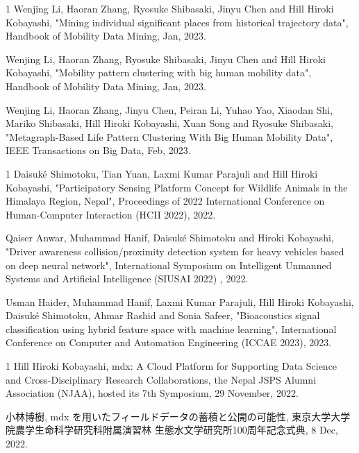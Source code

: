 \begin{雑誌論文}{1}
Wenjing Li, Haoran Zhang, Ryosuke Shibasaki,  Jinyu Chen and Hill Hiroki Kobayashi,  "Mining individual significant places from historical trajectory data", Handbook of Mobility Data Mining, Jan, 2023.

Wenjing Li, Haoran Zhang, Ryosuke Shibasaki,  Jinyu Chen and Hill Hiroki Kobayashi,  "Mobility pattern clustering with big human mobility data", Handbook of Mobility Data Mining, Jan, 2023.

Wenjing Li, Haoran Zhang, Jinyu Chen, Peiran Li, Yuhao Yao, Xiaodan Shi,  Mariko Shibasaki, Hill Hiroki Kobayashi, Xuan Song and Ryosuke Shibasaki,  "Metagraph-Based Life Pattern Clustering With Big Human Mobility Data", IEEE Transactions on Big Data, Feb, 2023.

\end{雑誌論文}

\begin{査読付}{1}
Daisuk\'e Shimotoku, Tian Yuan, Laxmi Kumar Parajuli and Hill Hiroki Kobayashi, "Participatory Sensing Platform Concept for Wildlife Animals in the Himalaya Region, Nepal", Proceedings of 2022 International Conference on Human-Computer Interaction (HCII 2022), 2022.  

Qaiser Anwar, Muhammad Hanif, Daisuk\'e Shimotoku and  Hiroki Kobayashi, "Driver awareness collision/proximity detection system for heavy vehicles based on deep neural network", International Symposium on Intelligent Unmanned Systems and Artificial Intelligence (SIUSAI 2022) , 2022.  

Usman Haider, Muhammad Hanif, Laxmi Kumar Parajuli, Hill Hiroki Kobayashi, Daisuk\'e Shimotoku, Ahmar Rashid and Sonia Safeer, "Bioacoustics signal classification using hybrid feature space with machine learning",  International Conference on Computer and Automation Engineering (ICCAE 2023), 2023.  

\end{査読付}

\begin{招待講演}{1}
Hill Hiroki Kobayashi, mdx: A Cloud Platform for Supporting Data Science and Cross-Disciplinary Research Collaborations, the Nepal JSPS Alumni Association (NJAA), hosted its 7th Symposium, 29 November, 2022.

小林博樹, mdx を用いたフィールドデータの蓄積と公開の可能性, 東京大学大学院農学生命科学研究科附属演習林 生態水文学研究所100周年記念式典, 8 Dec, 2022.

\end{招待講演}
